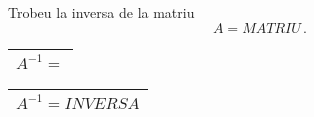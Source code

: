 \begin{enunciat}
Trobeu la inversa de la matriu 
\[
  A = MATRIU\,.
\]
\end{enunciat}

\begin{quadricula}
\begin{tabular}{|L{5cm}{1.25cm}|}
\hline
$A^{-1}=$ \\
\hline
\end{tabular}
\end{quadricula}

\begin{solucio}
\begin{center}
\begin{tabular}{|C{5cm}{1.25cm}|}
\hline
$A^{-1}=INVERSA$ \\
\hline
\end{tabular}
\end{center}
\end{solucio}

